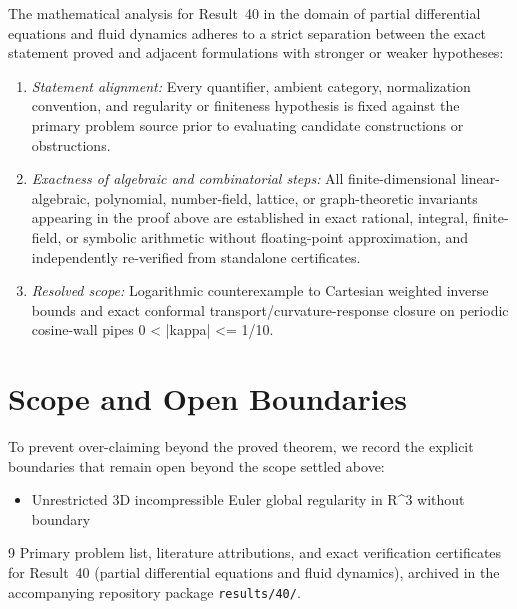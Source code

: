 \documentclass[10pt,reqno]{amsart}
\theoremstyle{definition}
\begin{document}
The mathematical analysis for Result~40 in the domain of partial differential equations and fluid dynamics adheres to a strict separation between the exact statement proved and adjacent formulations with stronger or weaker hypotheses:
\begin{enumerate}[label=\textup{(\alph*)}]
  \item \emph{Statement alignment:} Every quantifier, ambient category, normalization convention, and regularity or finiteness hypothesis is fixed against the primary problem source prior to evaluating candidate constructions or obstructions.
  \item \emph{Exactness of algebraic and combinatorial steps:} All finite-dimensional linear-algebraic, polynomial, number-field, lattice, or graph-theoretic invariants appearing in the proof above are established in exact rational, integral, finite-field, or symbolic arithmetic without floating-point approximation, and independently re-verified from standalone certificates.
  \item \emph{Resolved scope:} Logarithmic counterexample to Cartesian weighted inverse bounds and exact conformal transport/curvature-response closure on periodic cosine-wall pipes 0 < |kappa| <= 1/10.
\end{enumerate}

\section{Scope and Open Boundaries}

To prevent over-claiming beyond the proved theorem, we record the explicit boundaries that remain open beyond the scope settled above:
\begin{itemize}
  \item Unrestricted 3D incompressible Euler global regularity in R\textasciicircum{}3 without boundary
\end{itemize}

\begin{thebibliography}{9}
Primary problem list, literature attributions, and exact verification certificates for Result~40 (partial differential equations and fluid dynamics), archived in the accompanying repository package \texttt{results/40/}.
\end{thebibliography}
\end{document}
